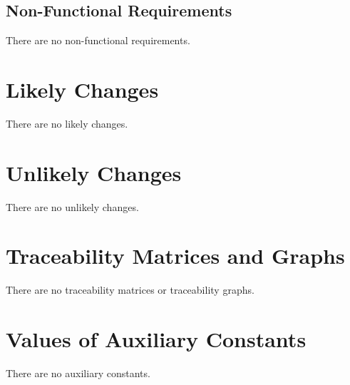 \documentclass[12pt]{article}
\begin{document}
\subsection{Non-Functional Requirements}
\label{Sec:NFRs}
There are no non-functional requirements.

\section{Likely Changes}
\label{Sec:LCs}
There are no likely changes.

\section{Unlikely Changes}
\label{Sec:UCs}
There are no unlikely changes.

\section{Traceability Matrices and Graphs}
\label{Sec:TraceMatrices}
There are no traceability matrices or traceability graphs.

\section{Values of Auxiliary Constants}
\label{Sec:AuxConstants}
There are no auxiliary constants.
\end{document}
